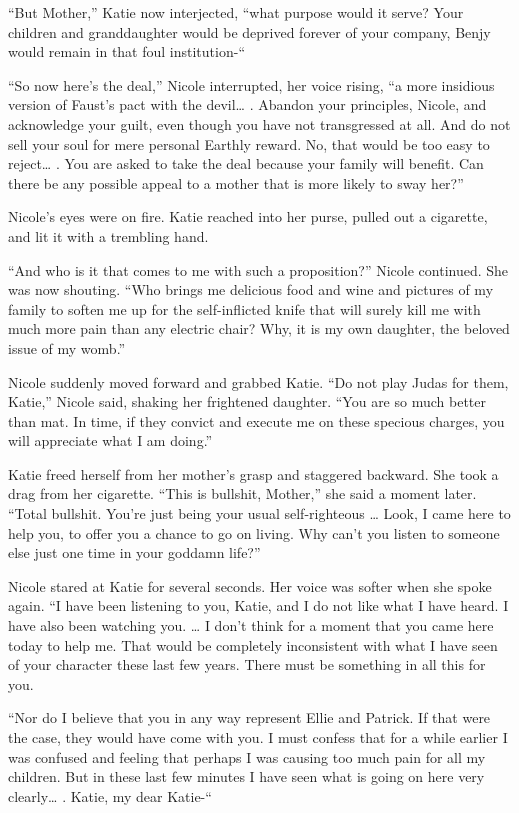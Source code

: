 \documentclass[]{article}
\begin{document}
{{“But Mother,” Katie now interjected, “what purpose would it serve? Your children and granddaughter would be deprived forever of your company, Benjy would remain in that foul institution-“

“So now here’s the deal,” Nicole interrupted, her voice rising, “a more insidious version of Faust’s pact with the devil… . Abandon your principles, Nicole, and acknowledge your guilt, even though you have not transgressed at all. And do not sell your soul for mere personal Earthly reward. No, that would be too easy to reject… . You are asked to take the deal because your family will benefit. Can there be any possible appeal to a mother that is more likely to sway her?”

Nicole’s eyes were on fire. Katie reached into her purse, pulled out a cigarette, and lit it with a trembling hand.

“And who is it that comes to me with such a proposition?” Nicole continued. She was now shouting. “Who brings me delicious food and wine and pictures of my family to soften me up for the self-inflicted knife that will surely kill me with much more pain than any electric chair? Why, it is my own daughter, the beloved issue of my womb.”

Nicole suddenly moved forward and grabbed Katie. “Do not play Judas for them, Katie,” Nicole said, shaking her frightened daughter. “You are so much better than mat. In time, if they convict and execute me on these specious charges, you will appreciate what I am doing.”

Katie freed herself from her mother’s grasp and staggered backward. She took a drag from her cigarette. “This is bullshit, Mother,” she said a moment later. “Total bullshit. You’re just being your usual self-righteous … Look, I came here to help you, to offer you a chance to go on living. Why can’t you listen to someone else just one time in your goddamn life?”

Nicole stared at Katie for several seconds. Her voice was softer when she spoke again. “I have been listening to you, Katie, and I do not like what I have heard. I have also been watching you. … I don’t think for a moment that you came here today to help me. That would be completely inconsistent with what I have seen of your character these last few years. There must be something in all this for you.

“Nor do I believe that you in any way represent Ellie and Patrick. If that were the case, they would have come with you. I must confess that for a while earlier I was confused and feeling that perhaps I was causing too much pain for all my children. But in these last few minutes I have seen what is going on here very clearly… . Katie, my dear Katie-“

}}
\end{document}
